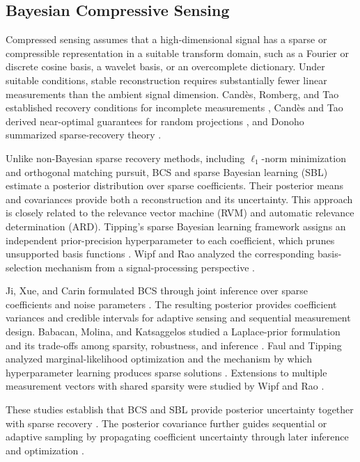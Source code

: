 \documentclass[lettersize,journal]{IEEEtran}
\begin{document}
\subsection{Bayesian Compressive Sensing}
Compressed sensing assumes that a high-dimensional signal has a sparse or compressible representation in a suitable transform domain, such as a Fourier or discrete cosine basis, a wavelet basis, or an overcomplete dictionary. Under suitable conditions, stable reconstruction requires substantially fewer linear measurements than the ambient signal dimension. Cand\`es, Romberg, and Tao established recovery conditions for incomplete measurements \cite{CandesRombergTao2006RUP}, Cand\`es and Tao derived near-optimal guarantees for random projections \cite{CandesTao2006NearOptimal}, and Donoho summarized sparse-recovery theory \cite{Donoho2006CompressedSensing}.

Unlike non-Bayesian sparse recovery methods, including $\ell_1$-norm minimization and orthogonal matching pursuit, BCS and sparse Bayesian learning (SBL) estimate a posterior distribution over sparse coefficients. Their posterior means and covariances provide both a reconstruction and its uncertainty. This approach is closely related to the relevance vector machine (RVM) and automatic relevance determination (ARD). Tipping's sparse Bayesian learning framework assigns an independent prior-precision hyperparameter to each coefficient, which prunes unsupported basis functions \cite{Tipping2001RVM}. Wipf and Rao analyzed the corresponding basis-selection mechanism from a signal-processing perspective \cite{WipfRao2004BasisSelection}.

Ji, Xue, and Carin formulated BCS through joint inference over sparse coefficients and noise parameters \cite{JiXueCarin2008BCS}. The resulting posterior provides coefficient variances and credible intervals for adaptive sensing and sequential measurement design. Babacan, Molina, and Katsaggelos studied a Laplace-prior formulation and its trade-offs among sparsity, robustness, and inference \cite{Babacan2010LaplaceBCS}. Faul and Tipping analyzed marginal-likelihood optimization and the mechanism by which hyperparameter learning produces sparse solutions \cite{FaulTipping2001AnalysisSBL}. Extensions to multiple measurement vectors with shared sparsity were studied by Wipf and Rao \cite{WipfRao2007SimultaneousSparse}.

These studies establish that BCS and SBL provide posterior uncertainty together with sparse recovery \cite{Tipping2001RVM,WipfRao2004BasisSelection,JiXueCarin2008BCS}. The posterior covariance further guides sequential or adaptive sampling by propagating coefficient uncertainty through later inference and optimization \cite{JiXueCarin2008BCS}.
\end{document}

